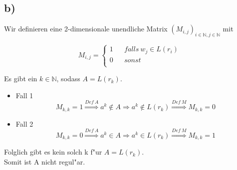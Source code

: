 \documentclass[a4paper,11pt]{scrartcl}
\begin{document}
	
\subsection*{b)}

		Wir definieren eine 2-dimensionale unendliche Matrix $(M_{i,j})_{i\in \mathbb{N},j\in \mathbb{N}}$ mit
		
		
		$$ M_{i,j}=\left\{
		\begin{aligned}
			1 &  & falls\ w_j \in L(r_i)\\
			0 &  & sonst\\
		\end{aligned}
		\right.
		$$
	
	Es gibt ein $k\in \mathbb N$, sodass $A = L(r_k)$.

	\begin{itemize}
		\item Fall 1
		$$
		M_{k,k} = 1 \overset{Def\ A}{\Longrightarrow} a^k \notin A \Longrightarrow a^k \notin L(r_k)	 \overset{Def\ M}{\Longrightarrow} M_{k,k} = 0
		$$
		
		\item Fall 2
		$$
		M_{k,k} = 0 \overset{Def\ A}{\Longrightarrow} a^k \in A \Longrightarrow a^k \in L(r_k) \overset{Def\ M}{\Longrightarrow} M_{k,k} = 1
		$$		
	\end{itemize}

	Folglich gibt es kein solch k f"ur $A = L(r_k)$.\\
	Somit ist A nicht regul"ar.















	
\end{document}
